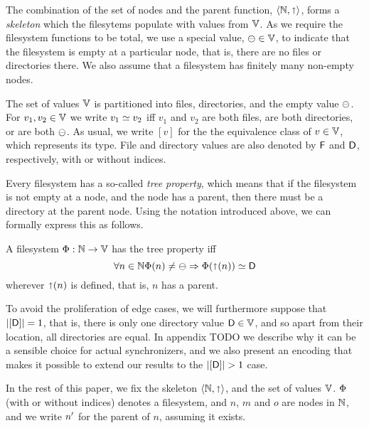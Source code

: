 The combination of the set of nodes and the parent function,
$\langle \mathbb{N}, \mathord{\shortuparrow} \rangle$, forms a \emph{skeleton}
which the filesytems populate with values from $\mathbb{V}$.
As we require the filesystem functions to be total,
we use a special value, $\ominus\in\mathbb{V}$, to indicate that the filesystem
is empty at a particular node, that is, there are no files or directories there.
We also assume that a filesystem has finitely many non-empty nodes.

\begin{mydef}
The set of values $\mathbb{V}$ is partitioned into files, directories, and the empty value $\ominus$.
For $v_1,v_2\in\mathbb{V}$ we write $v_1\simeq v_2$ iff
$v_1$ and $v_2$ are both files, are both directories, or are both $\ominus$.
As usual, we write $[v]$ for the the equivalence class of $v\in\mathbb{V}$, which represents its type.
File and directory values are also denoted by $\mathsf{F}$ and $\mathsf{D}$, respectively,
with or without indices.
\end{mydef}


Every filesystem has a so-called \emph{tree property}, which means that
if the filesystem is not empty at a node, and the node has a parent,
then there must be a directory at the parent node.
Using the notation introduced above, we can formally express this as follows.
\begin{mydef}
A filesystem $\Phi:\mathbb{N} \rightarrow \mathbb{V}$ has the tree property iff
\[ \forall n\in\mathbb{N}
\Phi(n) \neq \ominus \Rightarrow \Phi(\mathord{\shortuparrow}(n)) \simeq \mathsf{D} \]
wherever $\mathord{\shortuparrow}(n)$ is defined, that is, $n$ has a parent.
\end{mydef}


To avoid the proliferation of edge cases, we will furthermore suppose that
$|[\mathsf{D}]|=1$, that is, there is only one directory value $\mathsf{D}\in\mathbb{V}$, and so
apart from their location, all directories are equal.
In appendix TODO we describe why it can be a sensible choice
for actual synchronizers, and we also present an encoding that makes it possible
to extend our results to the $|\setd|>1$ case.



\smallskip
In the rest of this paper,
we fix the skeleton $\langle\mathbb{N},\mathord{\shortuparrow}\rangle$,
and the set of values $\mathbb{V}$.
$\Phi$ (with or without indices) denotes a filesystem,
and $n$, $m$ and $o$ are nodes in $\mathbb{N}$,
and we write $n'$ for the parent of $n$, assuming it exists.
